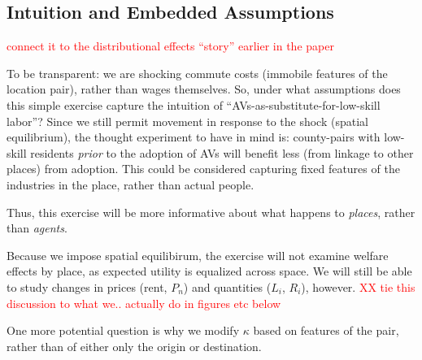 \documentclass{article}
\begin{document}



\subsection{Intuition and Embedded Assumptions}
\textcolor{red}{connect it to the distributional effects ``story'' earlier in the paper}


To be transparent: we are shocking commute costs (immobile features of the location pair), rather than wages themselves. 
So, under what assumptions does this simple exercise capture the intuition of ``AVs-as-substitute-for-low-skill labor''?
Since we still permit movement in response to the shock (spatial equilibrium), the thought experiment to have in mind is: county-pairs with low-skill residents \textit{prior} to the adoption of AVs will benefit less (from linkage to other places) from adoption.
This could be considered capturing fixed features of the industries in the place, rather than actual people.

Thus, this exercise will be more informative about what happens to \textit{places}, rather than \textit{agents}.








Because we impose spatial equilibirum, the exercise will not examine welfare effects by place, as expected utility is equalized across space.
We will still be able to study changes in prices (rent, $P_n$) and quantities ($L_i$, $R_i$), however. \textcolor{red}{XX tie this discussion to what we.. actually do in figures etc below}

One more potential question is why we modify $\kappa$ based on features of the pair, rather than of either only the origin or destination.
\end{document}
